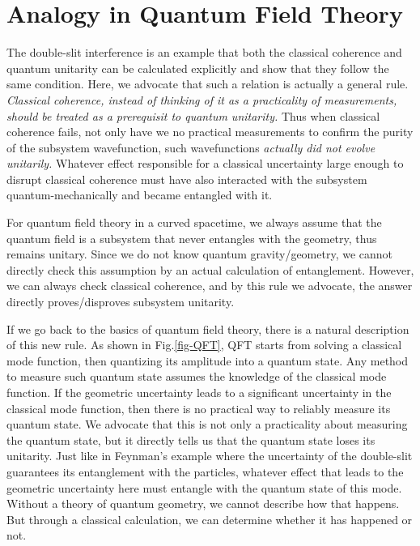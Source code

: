 \documentclass[aps,showpacs,onecolumn,floats,prd,superscriptaddress,nofootinbib]{revtex4-1}
\begin{document}
\section{Analogy in Quantum Field Theory}
\label{sec-QFT}

The double-slit interference is an example that both the classical coherence and quantum unitarity can be calculated explicitly and show that they follow the same condition.
Here, we advocate that such a relation is actually a general rule.
{\it Classical coherence, instead of thinking of it as a practicality of measurements, should be treated as a prerequisit to quantum unitarity.} 
Thus when classical coherence fails, not only have we no practical measurements to confirm the purity of the subsystem wavefunction, such wavefunctions {\it actually did not evolve unitarily.}
Whatever effect responsible for a classical uncertainty large enough to disrupt classical coherence must have also interacted with the subsystem quantum-mechanically and became entangled with it.

For quantum field theory in a curved spacetime, we always assume that the quantum field is a subsystem that never entangles with the geometry, thus remains unitary.
Since we do not know quantum gravity/geometry, we cannot directly check this assumption by an actual calculation of entanglement.
However, we can always check classical coherence, and by this rule we advocate, the answer directly proves/disproves subsystem unitarity.

If we go back to the basics of quantum field theory, there is a natural description of this new rule. 
As shown in Fig.\ref{fig-QFT}, QFT starts from solving a classical mode function, then quantizing its amplitude into a quantum state. 
Any method to measure such quantum state assumes the knowledge of the classical mode function. 
If the geometric uncertainty leads to a significant uncertainty in the classical mode function, then there is no practical way to reliably measure its quantum state. 
We advocate that this is not only a practicality about measuring the quantum state, but it directly tells us that the quantum state loses its unitarity. 
Just like in Feynman's example where the uncertainty of the double-slit guarantees its entanglement with the particles, whatever effect that leads to the geometric uncertainty here must entangle with the quantum state of this mode. 
Without a theory of quantum geometry, we cannot describe how that happens. 
But through a classical calculation, we can determine whether it has happened or not.
\end{document}
